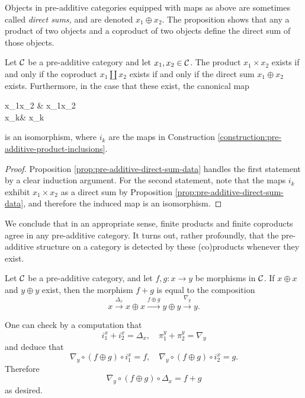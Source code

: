 \begin{remark}
	Objects in pre-additive categories equipped with maps as above are sometimes called \emph{direct sums,} and are denoted \(x_1\oplus x_2\). The proposition
	shows that any a product of two objects and a coproduct of two objects define the direct sum of those objects.
\end{remark}
\begin{corollary}
	Let \(\mathcal{C}\) be a pre-additive category and let \(x_1,x_2\in\mathcal{C}\). The product \(x_1\times x_2\) exists if and only if the coproduct \(x_1\amalg x_2\) exists if and only
	if the direct sum \(x_1\oplus x_2\) exists. Furthermore, in the case that these exist, the canonical map
	\begin{diagram*}
		x_1\amalg x_2 \ar[r,dashed] & x_1\times x_2 \\
		x_k\ar[u] \ar[r,equal] & x_k \ar[u,"i_k"']
	\end{diagram*}
	is an isomorphism, where \(i_k\) are the maps in Construction \ref{construction:pre-additive-product-inclusions}.
\end{corollary}
\begin{proof}
Proposition \ref{prop:pre-additive-direct-sum-data} handles the first statement by a clear induction argument. For the second statement,
note that the maps \(i_k\) exhibit \(x_1\times x_2\) as a direct sum by Proposition \ref{prop:pre-additive-direct-sum-data}, and therefore the induced map is an isomorphism.
\end{proof}

We conclude that in an appropriate sense, finite products and finite coproducts agree in any pre-additive category. It turns out, rather profoundly, that the pre-additive
structure on a category is detected by these (co)products whenever they exist.
\begin{proposition}
	Let \(\mathcal{C}\) be a pre-additive category, and let \(f,g\!:x\to y\) be morphisms in \(\mathcal{C}\). If \(x\oplus x\) and \(y\oplus y\) exist, then
	the morphism \(f+g\) is equal to the composition
	\[ x\xrightarrow{\Delta_x} x\oplus x \xrightarrow{f\oplus g} y\oplus y\xrightarrow{\nabla_y} y. \]
\end{proposition}
\begin{proofsketch}
One can check by a computation that
\[ i_1^x + i_2^x = \Delta_x,\quad \pi_1^y + \pi_2^y = \nabla_y \]
and deduce that
\[ \nabla_y \circ (f\oplus g)\circ i_1^x = f,\quad \nabla_y \circ (f\oplus g)\circ i_2^x = g. \]
Therefore
\[ \nabla_y \circ (f\oplus g)\circ \Delta_x = f+g \]
as desired.
\end{proofsketch}

